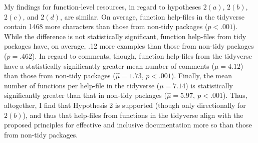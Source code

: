 My findings for function-level resources, in regard to hypotheses $2(a)$, $2(b)$, $2(c)$, and $2(d)$, are similar. On average, function help-files in the tidyverse contain 1468 more characters than those from non-tidy packages ($p < .001$). While the difference is not statistically significant, function help-files from tidy packages have, on average, .12 more examples than those from non-tidy packages ($p = .462$). In regard to comments, though, function help-files from the tidyverse have a statistically significantly greater mean number of comments ($\mu = 4.12$) than those from non-tidy packages ($\hat{\mu} = 1.73$, $p < .001$). Finally, the mean number of functions per help-file in the tidyverse ($\mu = 7.14$) is statistically significantly greater than that in non-tidy packages ($\hat{\mu} = 5.97, ~p < .001$). Thus, altogether, I find that Hypothesis 2 is supported (though only directionally for $2(b)$), and thus that help-files from functions in the tidyverse align with the proposed principles for effective and inclusive documentation more so than those from non-tidy packages.


